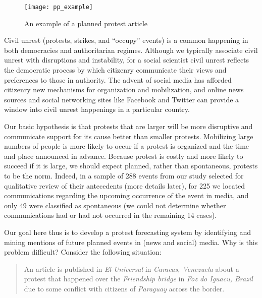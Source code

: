 \begin{figure*}
    \texttt{[image: pp\_example]}
    \caption{An example of a planned protest article}
    \label{pp_example}
\end{figure*}
Civil unrest (protests, strikes, and ``occupy'' events) is a common happening in both democracies
and authoritarian regimes.
Although we typically associate civil unrest with disruptions and instability, for a social scientist
civil unrest reflects the democratic process by 
which citizenry communicate their views and preferences to those in authority. 
The advent of social
media has afforded citizenry new mechanisms for organization and mobilization, and online news sources
and social networking sites like Facebook and Twitter
can provide a window into civil unrest happenings in a particular country.

Our basic hypothesis is that
protests that are larger will be more disruptive and communicate support for its cause better than smaller protests. 
Mobilizing large numbers of people is more likely to occur if a protest is organized and the time and place announced in
advance. Because protest is costly and more likely to succeed if it is large, we should expect planned, rather than 
spontaneous, protests to be the norm. Indeed, in a sample of 288 events from our study selected for qualitative review of their antecedents
(more details later), for 225 we located communications regarding the upcoming occurrence of the event in media, and only 49 were classified as 
spontaneous (we could not determine whether communications had or had not occurred in the remaining 14 cases).

Our goal here thus is to develop a protest forecasting system by identifying and mining mentions of future planned events
in (news and social) media. Why is this problem difficult? Consider the following situation:
\begin{quote}
An article is published in {\it El Universal}
in {\it Caracas, Venezuela} about a protest that happened over the {\it Friendship bridge} in {\it Foz do Iguacu, Brazil} due to
some conflict with citizens of {\it Paraguay}
across the border.
\end{quote}


